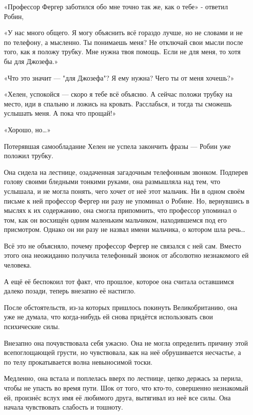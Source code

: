 \documentclass[a4paper,12pt]{book}
\begin{document}
«Профессор Фергер заботился обо мне точно так же, как о тебе» - ответил Робин,
\par
«У нас много общего. Я могу объяснить всё гораздо лучше, но не словами и не по телефону, а мысленно. Ты понимаешь меня? Не отключай свои мысли после того, как я положу трубку. Мне нужна твоя помощь. Если не для меня, то хотя бы для Джозефа.»
\par
«Что это значит — "для Джозефа"? Я ему нужна? Чего ты от меня хочешь?»
\par
«Хелен, успокойся — скоро я тебе всё объясню. А сейчас положи трубку на место, иди в спальню и ложись на кровать. Расслабься, и тогда ты сможешь услышать меня. А пока что прощай!»
\par
«Хорошо, но…»
\par
Потерявшая самообладание Хелен не успела закончить фразы — Робин уже положил трубку.\\
\par
Она сидела на лестнице, озадаченная загадочным телефонным звонком. Подперев голову своими бледными тонкими руками, она размышляла над тем, что услышала, и не могла понять, чего хочет от неё этот мальчик. Ни в одном своём письме к ней профессор Фергер ни разу не упоминал о Робине. Но, вернувшись в мыслях к их содержанию, она смогла припомнить, что профессор упоминал о том, как он восхищён одним маленьким мальчиком, находившемся под его присмотром. Однако он ни разу не назвал имени мальчика, о котором шла речь…
\par
Всё это не объясняло, почему профессор Фергер не связался с ней сам. Вместо этого она неожиданно получила телефонный звонок от абсолютно незнакомого ей человека.
\par
А ещё её беспокоил тот факт, что прошлое, которое она считала оставшимся далеко позади, теперь внезапно её настигло.
\par
После обстоятельств, из-за которых пришлось покинуть Великобританию, она уже не думала, что когда-нибудь ей снова придётся использовать свои психические силы.
\par
Внезапно она почувствовала себя ужасно. Она не могла определить причину этой всепоглощающей грусти, но чувствовала, как на неё обрушивается несчастье, а по телу прокатывается волна невыносимой тоски.
\par
Медленно, она встала и поплелась вверх по лестнице, цепко держась за перила, чтобы не упасть во время пути. Шок от того, что кто-то, совершенно незнакомый ей, произнёс вслух имя её любимого друга, вытягивал из неё все силы. Она начала чувствовать слабость и тошноту.\\
\end{document}
